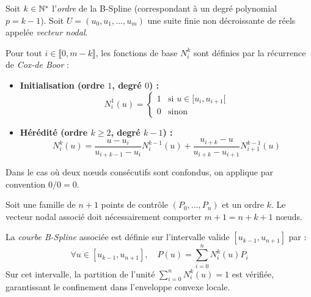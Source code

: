 \begin{definition}
    Soit $k \in \mathbb{N}^*$ l'\emph{ordre} de la B-Spline (correspondant à un degré polynomial $p = k - 1$).
    Soit $U = (u_0, u_1, \dots, u_m)$ une suite finie non décroissante de réels appelée \emph{vecteur nodal}.
    
    Pour tout $i \in \llbracket 0, m-k \rrbracket$, les fonctions de base $N_i^k$ sont définies par la récurrence de \emph{Cox-de Boor} :
    \begin{itemize}
        \item \textbf{Initialisation (ordre $1$, degré $0$) :}
        \begin{equation}
            N_i^1(u) = 
            \begin{cases}
                1 & \text{si } u \in [u_i, u_{i+1}[ \\
                0 & \text{sinon}
            \end{cases}
        \end{equation}
        \item \textbf{Hérédité (ordre $k \geqslant 2$, degré $k - 1$) :}
        \begin{equation}
            N_i^k(u) = \frac{u - u_i}{u_{i+k-1} - u_i} N_i^{k-1}(u) + \frac{u_{i+k} - u}{u_{i+k} - u_{i+1}} N_{i+1}^{k-1}(u)
        \end{equation}
    \end{itemize}
    Dans le cas où deux nœuds consécutifs sont confondus, on applique par convention $0/0 = 0$.
\end{definition}

\begin{definition}
    Soit une famille de $n+1$ points de contrôle $(P_0, \dots, P_n)$ et un ordre $k$. Le vecteur nodal associé doit nécessairement comporter $m + 1 = n + k + 1$ nœuds.
    
    La \emph{courbe B-Spline} associée est définie sur l'intervalle valide $[u_{k-1}, u_{n+1}]$ par :
    \begin{equation}
        \forall u \in [u_{k-1}, u_{n+1}], \quad P(u) = \sum_{i=0}^n N_i^k(u) P_i
    \end{equation}
    Sur cet intervalle, la partition de l'unité $\sum_{i=0}^n N_i^k(u) = 1$ est vérifiée, garantissant le confinement dans l'enveloppe convexe locale.
\end{definition}

